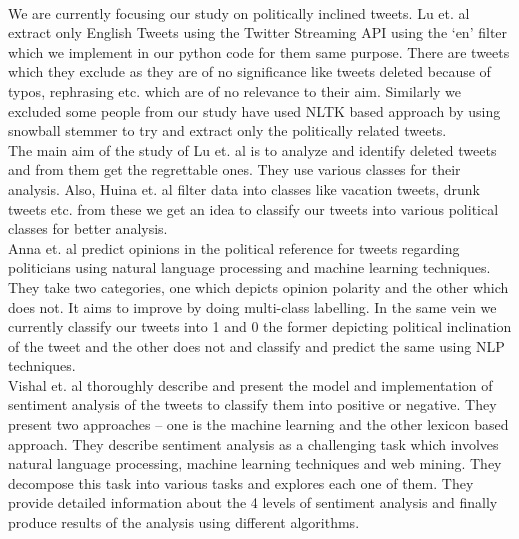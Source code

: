 \documentclass[a4paper,11pt]{article}
\begin{document}
\medskip\\
We are currently focusing our study on politically inclined tweets. Lu et. al \cite{zhou2016tweet} extract only English Tweets using the Twitter Streaming API using the ‘en’ filter which we implement in our python code for them same purpose. There are tweets which they exclude as they are of no significance like tweets deleted because of typos, rephrasing etc. which are of no relevance to their aim. Similarly we excluded some people from our study have used NLTK based approach by using snowball stemmer to try and extract only the politically related tweets.
\medskip\\
The main aim of the study of Lu et. al \cite{zhou2016tweet} is to analyze and identify deleted tweets and  from them get the regrettable ones. They use various classes for their analysis. Also, Huina et. al \cite{mao2011loose} filter data into classes like vacation tweets, drunk tweets etc. from these we get an idea to classify our tweets into various political classes for better analysis.
\medskip\\
Anna et. al \cite{stavrianou2014nlp} predict opinions in the political reference for tweets regarding politicians using natural language processing and machine learning techniques. They take two categories, one which depicts opinion polarity and the other which does not. It aims to improve by doing multi-class labelling. In the same vein we currently classify our tweets into 1 and 0 the former depicting political inclination of the tweet and the other does not and classify and predict the same using NLP techniques.
\medskip\\
Vishal et. al \cite{kharde2016sentiment} thoroughly describe and present the model and implementation of sentiment analysis of the tweets to classify them into positive or negative. They present two approaches – one is the machine learning and the other lexicon based approach. They describe sentiment analysis as a challenging task which involves natural language processing, machine learning techniques and web mining. They decompose this task into various tasks and explores each one of them. They provide detailed information about the 4 levels of sentiment analysis and finally produce results of the analysis using different algorithms. 
\end{document}
